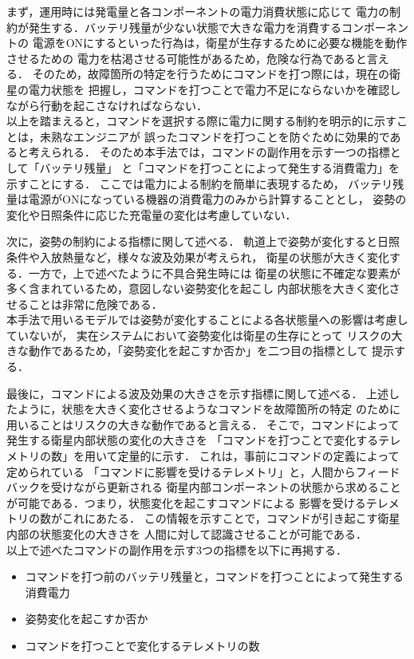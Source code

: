 \documentclass[11pt]{jsreport}
\begin{document}
まず，運用時には発電量と各コンポーネントの電力消費状態に応じて
電力の制約が発生する．バッテリ残量が少ない状態で大きな電力を消費するコンポーネントの
電源をONにするといった行為は，衛星が生存するために必要な機能を動作させるための
電力を枯渇させる可能性があるため，危険な行為であると言える．
そのため，故障箇所の特定を行うためにコマンドを打つ際には，現在の衛星の電力状態を
把握し，コマンドを打つことで電力不足にならないかを確認しながら行動を起こさなければならない．\\
以上を踏まえると，コマンドを選択する際に電力に関する制約を明示的に示すことは，未熟なエンジニアが
誤ったコマンドを打つことを防ぐために効果的であると考えられる．
そのため本手法では，コマンドの副作用を示す一つの指標として「バッテリ残量」
と「コマンドを打つことによって発生する消費電力」を示すことにする．
ここでは電力による制約を簡単に表現するため，
バッテリ残量は電源がONになっている機器の消費電力のみから計算することとし，
姿勢の変化や日照条件に応じた充電量の変化は考慮していない．

次に，姿勢の制約による指標に関して述べる．
軌道上で姿勢が変化すると日照条件や入放熱量など，様々な波及効果が考えられ，
衛星の状態が大きく変化する．一方で，上で述べたように不具合発生時には
衛星の状態に不確定な要素が多く含まれているため，意図しない姿勢変化を起こし
内部状態を大きく変化させることは非常に危険である．\\
本手法で用いるモデルでは姿勢が変化することによる各状態量への影響は考慮していないが，
実在システムにおいて姿勢変化は衛星の生存にとって
リスクの大きな動作であるため，「姿勢変化を起こすか否か」を二つ目の指標として
提示する．

最後に，コマンドによる波及効果の大きさを示す指標に関して述べる．
上述したように，状態を大きく変化させるようなコマンドを故障箇所の特定
のために用いることはリスクの大きな動作であると言える．
そこで，コマンドによって発生する衛星内部状態の変化の大きさを
「コマンドを打つことで変化するテレメトリの数」を用いて定量的に示す．
これは，事前にコマンドの定義によって定められている
「コマンドに影響を受けるテレメトリ」と，人間からフィードバックを受けながら更新される
衛星内部コンポーネントの状態から求めることが可能である．つまり，状態変化を起こすコマンドによる
影響を受けるテレメトリの数がこれにあたる．
この情報を示すことで，コマンドが引き起こす衛星内部の状態変化の大きさを
人間に対して認識させることが可能である．\\
以上で述べたコマンドの副作用を示す3つの指標を以下に再掲する．
\begin{itemize}
   \item コマンドを打つ前のバッテリ残量と，コマンドを打つことによって発生する消費電力
   \item 姿勢変化を起こすか否か
   \item コマンドを打つことで変化するテレメトリの数
\end{itemize}
\end{document}
